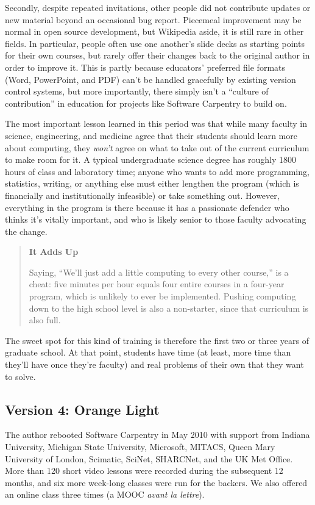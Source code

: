 \documentclass[10pt,a4paper,twocolumn]{article}
\begin{document}
Secondly, despite repeated invitations, other people did not
contribute updates or new material beyond an occasional bug report.
Piecemeal improvement may be normal in open source development, but
Wikipedia aside, it is still rare in other fields. In particular,
people often use one another's slide decks as starting points for
their own courses, but rarely offer their changes back to the original
author in order to improve it. This is partly because educators'
preferred file formats (Word, PowerPoint, and PDF) can't be handled
gracefully by existing version control systems, but more importantly,
there simply isn't a ``culture of contribution'' in education for
projects like Software Carpentry to build on.

The most important lesson learned in this period was that while many
faculty in science, engineering, and medicine agree that their
students should learn more about computing, they \emph{won't} agree on
what to take out of the current curriculum to make room for it. A
typical undergraduate science degree has roughly 1800 hours of class
and laboratory time; anyone who wants to add more programming,
statistics, writing, or anything else must either lengthen the program
(which is financially and institutionally infeasible) or take
something out. However, everything in the program is there because it
has a passionate defender who thinks it's vitally important, and who
is likely senior to those faculty advocating the change.

\begin{quote}
\textbf{It Adds Up}

Saying, ``We'll just add a little computing to every other course,'' is
a cheat: five minutes per hour equals four entire courses in a four-year
program, which is unlikely to ever be implemented. Pushing computing
down to the high school level is also a non-starter, since that
curriculum is also full.
\end{quote}

The sweet spot for this kind of training is therefore the first two or
three years of graduate school. At that point, students have time (at
least, more time than they'll have once they're faculty) and real
problems of their own that they want to solve.

\subsection*{Version 4: Orange Light}

The author rebooted Software Carpentry in May 2010 with support from
Indiana University, Michigan State University, Microsoft, MITACS, Queen
Mary University of London, Scimatic, SciNet, SHARCNet, and the UK Met
Office. More than 120 short video lessons were recorded during the
subsequent 12 months, and six more week-long classes were run for the
backers. We also offered an online class three times (a MOOC \emph{avant
la lettre}).
\end{document}
